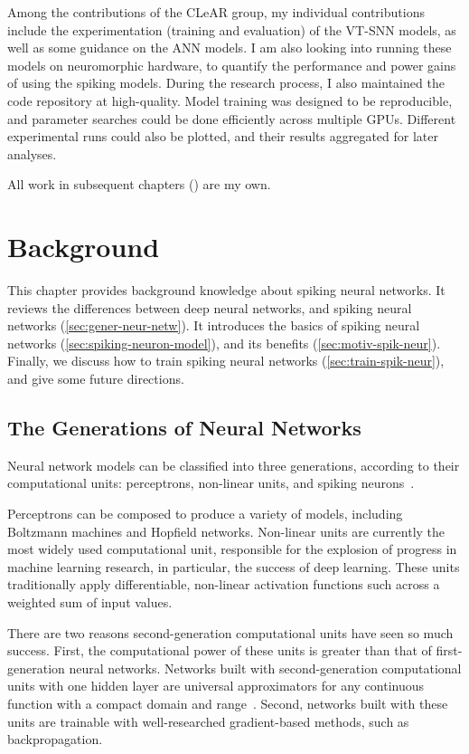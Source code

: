 \documentclass[fyp]{socreport}
\begin{document}
Among the contributions of the CLeAR group, my individual contributions include
the experimentation (training and evaluation) of the VT-SNN models, as well as
some guidance on the ANN models. I am also looking into running these models on
neuromorphic hardware, to quantify the performance and power gains of using the
spiking models. During the research process, I also maintained the code
repository at high-quality. Model training was designed to be reproducible, and
parameter searches could be done efficiently across multiple GPUs. Different
experimental runs could also be plotted, and their results aggregated for later
analyses.

All work in subsequent chapters () %
are my own.

\chapter{Background\label{chp:background}}

This chapter provides background knowledge about spiking neural networks. It
reviews the differences between deep neural networks, and spiking neural
networks (\ref{sec:gener-neur-netw}). It introduces the basics of spiking neural
networks (\ref{sec:spiking-neuron-model}), and its benefits
(\ref{sec:motiv-spik-neur}). Finally, we discuss how to train spiking neural
networks (\ref{sec:train-spik-neur}), and give some future directions.

\section{The Generations of Neural Networks\label{sec:gener-neur-netw}}

Neural network models can be classified into three generations, according to
their computational units: perceptrons, non-linear units, and spiking
neurons~\cite{MAASS19971659}.

Perceptrons can be composed to produce a variety of models, including Boltzmann
machines and Hopfield networks. Non-linear units are currently the most widely
used computational unit, responsible for the explosion of progress in machine
learning research, in particular, the success of deep learning. These units
traditionally apply differentiable, non-linear activation functions such across
a weighted sum of input values.

There are two reasons second-generation computational units have seen so much
success. First, the computational power of these units is greater than that of
first-generation neural networks. Networks built with second-generation
computational units with one hidden layer are universal approximators for any
continuous function with a compact domain and range~\cite{Cybenko1989}. Second,
networks built with these units are trainable with well-researched
gradient-based methods, such as backpropagation.
\end{document}
